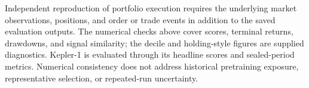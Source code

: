 Independent reproduction of portfolio execution requires the underlying market observations, positions, and order or trade events in addition to the saved evaluation outputs. The numerical checks above cover scores, terminal returns, drawdowns, and signal similarity; the decile and holding-style figures are supplied diagnostics. Kepler-1 is evaluated through its headline scores and sealed-period metrics. Numerical consistency does not address historical pretraining exposure, representative selection, or repeated-run uncertainty.
